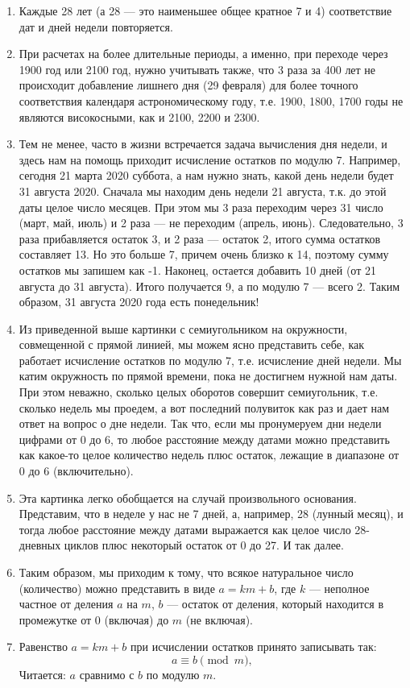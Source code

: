 \begin{enumerate}
\item Каждые 28 лет (а 28 --- это наименьшее общее кратное 7 и 4) соответствие дат и дней недели повторяется.
\item При расчетах на более длительные периоды, а именно, при переходе через 1900 год или 2100 год, нужно учитывать также, что 3 раза за 400 лет не происходит добавление лишнего дня (29 февраля) для более точного соответствия календаря астрономическому году, т.е. 1900, 1800, 1700 годы не являются високосными, как и 2100, 2200 и 2300.
\item Тем не менее, часто в жизни встречается задача вычисления дня недели, и здесь нам на помощь приходит исчисление остатков по модулю 7. Например, сегодня 21 марта 2020 суббота, а нам нужно знать, какой день недели будет 31 августа 2020. Сначала мы находим день недели 21 августа, т.к. до этой даты целое число месяцев. При этом мы 3 раза переходим через 31 число (март, май, июль) и 2 раза --- не переходим (апрель, июнь). Следовательно, 3 раза прибавляется остаток 3, и 2 раза --- остаток 2, итого сумма остатков составляет 13. Но это больше 7, причем очень близко к 14, поэтому сумму остатков мы запишем как -1. Наконец, остается добавить 10 дней (от 21 августа до 31 августа). Итого получается 9, а по модулю 7 --- всего 2. Таким образом, 31 августа 2020 года есть понедельник!
\item Из приведенной выше картинки с семиугольником на окружности, совмещенной с прямой линией, мы можем ясно представить себе, как работает исчисление остатков по модулю 7, т.е. исчисление дней недели. Мы катим окружность по прямой времени, пока не достигнем нужной нам даты. При этом неважно, сколько целых оборотов совершит семиугольник, т.е. сколько недель мы проедем, а вот последний полувиток как раз и дает нам ответ на вопрос о дне недели. Так что, если мы пронумеруем дни недели цифрами от 0 до 6, то любое расстояние между датами можно представить как какое-то целое количество недель плюс остаток, лежащие в диапазоне от 0 до 6 (включительно).
\item Эта картинка легко обобщается на случай произвольного основания. Представим, что в неделе у нас не 7 дней, а, например, 28 (лунный месяц), и тогда любое расстояние между датами выражается как целое число 28-дневных циклов плюс некоторый остаток от 0 до 27. И так далее.
\item Таким образом, мы приходим к тому, что всякое натуральное число (количество) можно представить в виде $a=km+b$, где $k$ --- неполное частное от деления $a$ на $m$, $b$ --- остаток от деления, который находится в промежутке от 0 (включая) до $m$ (не включая).
\item Равенство $a=km+b$ при исчислении остатков принято записывать так:
$$
a\equiv b\pmod m,
$$
Читается: $a$ сравнимо с $b$ по модулю $m$.


\end{enumerate}
